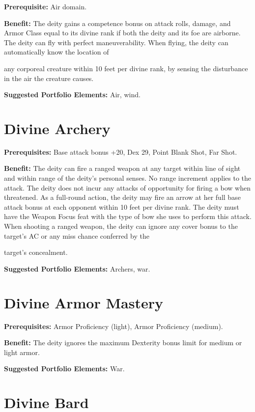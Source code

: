 \documentclass{article}
\begin{document}
\textbf{Prerequisite:} Air domain.

\textbf{Benefit:} The deity gains a competence bonus on attack rolls, damage, and 
Armor Class equal to its divine rank if both the deity and its foe are airborne. 
The deity can fly with perfect maneuverability. When flying, the deity can automatically 
know the location of

any corporeal creature within 10 feet per divine rank, by sensing the disturbance 
in the air the creature causes.

\textbf{Suggested Portfolio Elements:} Air, wind.

\vspace{12pt}
\section*{Divine Archery}

\textbf{Prerequisites:} Base attack bonus +20, Dex 29, Point Blank Shot, Far Shot.

\textbf{Benefit:} The deity can fire a ranged weapon at any target within line 
of sight and within range of the deity's personal senses. No range increment applies 
to the attack. The deity does not incur any attacks of opportunity for firing a 
bow when threatened. As a full-round action, the deity may fire an arrow at her 
full base attack bonus at each opponent within 10 feet per divine rank. The deity 
must have the Weapon Focus feat with the type of bow she uses to perform this attack. 
When shooting a ranged weapon, the deity can ignore any cover bonus to the target's 
AC or any miss chance conferred by the

target's concealment.

\textbf{Suggested Portfolio Elements:} Archers, war.

\vspace{12pt}
\section*{Divine Armor Mastery}

\textbf{Prerequisites:} Armor Proficiency (light), Armor Proficiency (medium).

\textbf{Benefit:} The deity ignores the maximum Dexterity bonus limit for medium 
or light armor.

\textbf{Suggested Portfolio Elements:} War.

\vspace{12pt}
\section*{Divine Bard}
\end{document}
